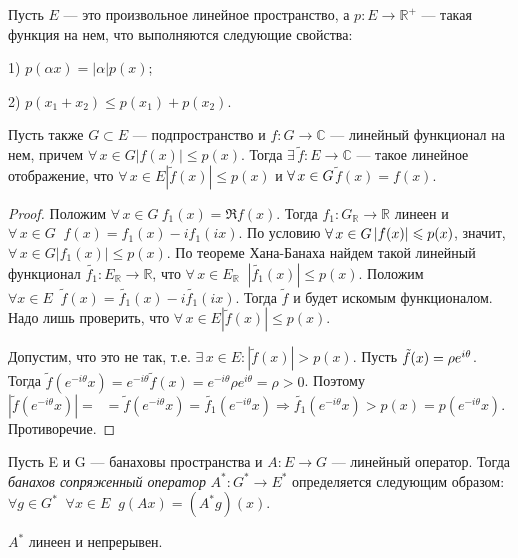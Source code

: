 \documentclass[10pt,titlepage, a4paper]{article}
\begin{document}
\begin{theorem}
Пусть $E$ --- это произвольное линейное пространство, а $p\colon
E\to\mathbb{R}^+$ --- такая функция на нем, что выполняются
следующие свойства:

1\textup{)} $p(\alpha x)=|\alpha| p(x)$;

2\textup{)} $p(x_1+x_2)\leqslant p(x_1)+p(x_2)$.

Пусть также $G\subset E$ --- подпространство и $f\colon
G\to\mathbb{C}$ --- линейный функционал на нем, причем
$\forall\,x\in G$\;\;$|f(x)|\leqslant p(x)$. Тогда
$\exists\,\tilde{f}\colon E\to \mathbb{C}$ --- такое линейное
отображение, что $\forall\,x\in E$\;\;$|\tilde{f}(x)|\leqslant p(x)$
и $\forall\,x\p\in G$\;\;$\tilde{f}(x)=f(x)$.
\end{theorem}

\begin{proof}
Положим $\forall\, x\in G\ f_1(x)=\Re f(x)$. Тогда $f_1\colon
G_{\mathbb{R}}\rightarrow \mathbb{R}$ линеен и $\forall\, x \in
G\;\; f(x)=f_1(x)-if_1(ix)$. По условию $\forall\,x\p\in
G$\;\;$|f(x)|\p\leqslant p(x)$, значит, $\forall\,x\in
G$\;\;$|f_1(x)|\leqslant p(x)$. По теореме Хана-Банаха найдем такой
линейный функционал $\tilde{f_1}\colon E_{\mathbb{R}}\rightarrow
\mathbb{R}$, что $\forall\, x\in E_{\mathbb{R}}
\;\;|\tilde{f_1}(x)|\leqslant p(x)$. Положим $\forall x \in E\;\;
\tilde{f}(x)=\tilde{f_1}(x)-i\tilde{f_1}(ix)$. Тогда $\tilde{f}$ и
будет искомым функционалом. Надо лишь проверить, что $\forall\,x\in
E$\;\;$|\tilde{f}(x)|\leqslant p(x)$.

Допустим, что это не так, т.е. $\exists\, x\in E:
|\tilde{f}(x)|>p(x)$. Пусть $\tilde{f}(x)\p=\rho e^{i\theta}$. Тогда
$\tilde{f}(e^{-i\theta}x)=e^{-i\theta}\tilde{f}(x)=e^{-i\theta}\rho
e^{i\theta}=\rho>0$. Поэтому
$|\tilde{f}(e^{-i\theta}x)|=\;\;=\tilde{f}(e^{-i\theta}x)=\tilde{f_1}(e^{-i\theta}x)\Rightarrow
\tilde{f_1}(e^{-i\theta}x)>p(x)=p(e^{-i\theta}x)$. Противоречие.
\end{proof}

\begin{defen}
Пусть E и G --- банаховы пространства и $A\colon E\rightarrow G$
--- линейный оператор. Тогда \emph{банахов сопряженный оператор} $A^*\colon
G^*\rightarrow E^*$ определяется следующим образом: $\forall g\in
G^* \;\;\forall x\in E \;\;g(Ax)=(A^*g)(x)$.
\end{defen}

\begin{predl}
$A^*$ линеен и непрерывен.
\end{predl}
\end{document}
